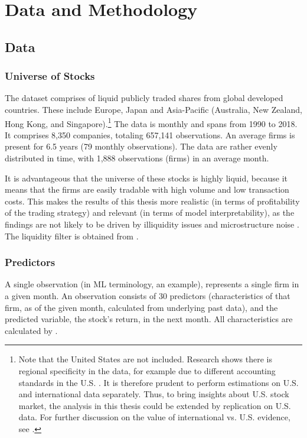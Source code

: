 \chapter{Data and Methodology}
\label{chap:met}

\section{Data}

	\subsection{Universe of Stocks}
		The dataset comprises of liquid publicly traded shares from global developed countries. These include Europe, Japan and Asia-Pacific (Australia, New Zealand, Hong Kong, and Singapore).\footnote{Note that the United States are not included. Research shows there is regional specificity in the data, for example due to different accounting standards in the U.S. \citep{tobek2020does}. It is therefore prudent to perform estimations on U.S. and international data separately. Thus, to bring insights about U.S. stock market, the analysis in this thesis could be extended by replication on U.S. data. For further discussion on the value of international vs. U.S. evidence, see \cite{tobek2020does}.} The data is monthly and spans from 1990 to 2018. It comprises 8,350 companies, totaling 657,141 observations. An average firms is present for 6.5 years (79 monthly observations). The data are rather evenly distributed in time, with 1,888 observations (firms) in an average month. 
		
		It is advantageous that the universe of these stocks is highly liquid, because it means that the firms are easily tradable with high volume and low transaction costs. This makes the results of this thesis more realistic (in terms of profitability of the trading strategy) and relevant (in terms of model interpretability), as the findings are not likely to be driven by illiquidity issues and microstructure noise \citep{asparouhova2010liquidity}. The liquidity filter is obtained from \cite{tobek2020does}.
		
	
	\subsection{Predictors}
	
		A single observation (in ML terminology, an example), represents a single firm in a given month. An observation consists of 30 predictors  (characteristics of that firm, as of the given month, calculated from underlying past data), and the predicted variable, the stock's return, in the next month. All characteristics are calculated by \cite{tobek2020does}.   
		
